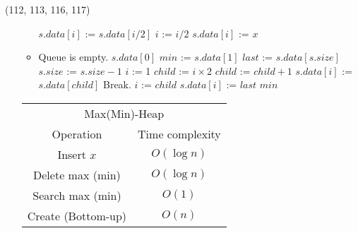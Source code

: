 \begin{theorem}{(112, 113, 116, 117)}
\begin{itemize}
\begin{itemize}
\begin{algorithm}[H]
\begin{algorithmic}[1]
                            \State $s.data[i]$ := $s.data[i / 2]$
                            \State $i$ := $i / 2$
                        \EndWhile
                        \State $s.data[i]$ := $x$
                    \EndFunction
                \end{algorithmic}
            \end{algorithm} 
            \item \begin{algorithm}[H]
                \begin{algorithmic}[1]
                            \State Queue is empty.
                            \State \Return $s.data[0]$
                        \EndIf
                        \State $min$ := $s.data[1]$
                        \State $last$ := $s.data[s.size]$
                        \State $s.size$ := $s.size - 1$
                        \State $i$ := 1
                            \State $child$ := $i \times 2$
                             
                                \State $child$ := $child + 1$
                            \EndIf
                             
                                \State $s.data[i]$ := $s.data[child]$
                            \Else
                                \State Break.
                            \EndIf
                            \State $i$ := $child$
                        \EndWhile
                        \State $s.data[i]$ := $last$
                        \State \Return $min$
                    \EndFunction
                \end{algorithmic}
            \end{algorithm} 
        \end{itemize}
        \begin{table}[H]
            \centering
            \begin{tabular}{|c|c|}
                \hline
                \multicolumn{2}{|c|}{Max(Min)-Heap} \\
                \Xhline{3\arrayrulewidth}
                Operation & Time complexity \\
                \Xhline{2\arrayrulewidth}
                Insert $x$ & $O(\log n)$ \\
                \hline
                Delete max (min) & $O(\log n)$ \\
                \hline
                Search max (min) & $O(1)$ \\
                \hline
                Create (Bottom-up) & $O(n)$ \\
                \hline
            \end{tabular}
        \end{table}
    \end{itemize}
\end{theorem}

